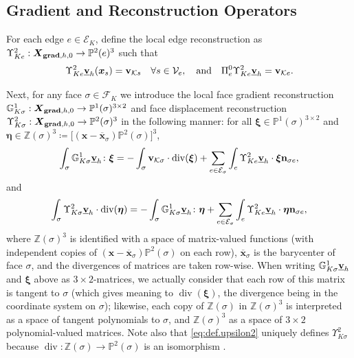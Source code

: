 \documentclass[a4paper,11pt]{article}
\theoremstyle{definition}
\theoremstyle{remark}
\newcommand{\bvec}[1]{\boldsymbol{#1}}
\newcommand{\bo}[1]{\mathbf{#1}}
\newcommand{\bx}{\bvec{x}}
\newcommand{\bos}[1]{\boldsymbol{#1}}
\def\G{\mathbb{G}}
\def\cE{\mathcal{E}}
\def\cF{\mathcal{F}}
\def\cK{\mathcal{K}}
\def\cV{\mathcal{V}}
\def\Up{\Upsilon}
\def\bv{{\bf{v}}}
\def\ddgs{\boldsymbol{X}_{{\bf grad},h,0}}
\newcommand{\Ks}{{\mathcal{K}s}}
\newcommand{\Ke}{{\mathcal{K}e}}
\newcommand{\DIV}{\operatorname{\mathrm{div}}}
\begin{document}

\subsection{Gradient and Reconstruction Operators}\label{subsec reconstruct}

For each edge $e\in\cE_K$, define the local edge reconstruction as $\Upsilon_{Ke}^2:\ddgs\rightarrow \mathbb P^2(e)^3$ such that
$$
\Upsilon_{Ke}^2\underline{\bv}_h(\bx_s)=\bo{v}_{\Ks}\quad \forall s\in\cV_e,\quad\text{and}\quad
\Pi^0_e\Upsilon^2_{Ke}\underline{\bv}_h=\bo{v}_{\Ke}.
$$

Next, for any face $\sigma\in\cF_K$ we introduce the local face gradient reconstruction $\mathbb G^1_{K\sigma}:\ddgs\rightarrow \mathbb P^1(\sigma)^{3\times 2}$ and face displacement reconstruction $\Upsilon^2_{K\sigma}:\ddgs\rightarrow \mathbb P^2(\sigma)^3$ in the following manner: for all $\bos{\xi}\in\mathbb P^1(\sigma)^{3\times 2}$ and $\bos{\eta}\in\mathbb Z(\sigma)^3\coloneqq\big[(\bx-\overline{\bx}_\sigma)\mathbb P^2(\sigma)\big]^3$,
\begin{equation*}%
\int_\sigma \G^1_{K\sigma}\underline{\bv}_h\colon\bos{\xi}=-\int_\sigma \bo{v}_{\cK\sigma}\cdot\DIV(\bos{\xi})+\sum_{e\in\cE_\sigma}\int_e \Up^2_{Ke}\underline{\bv}_h\cdot\bo{\bos{\xi}}{{\bf n}_{\sigma e}},
\end{equation*}
and
\begin{equation}\label{eq:def.upsilon2}
\int_\sigma \Up^2_{K\sigma}\underline{\bv}_h\cdot\DIV(\bos{\eta})=-\int_\sigma \G^1_{K\sigma}\underline{\bv}_h\colon\bos{\eta}+\sum_{e\in\cE_\sigma}\int_e \Up^2_{Ke}\underline{\bv}_h\cdot\bos{\eta}{\bo{\bf n}_{\sigma e}},
\end{equation}
where $\mathbb Z(\sigma)^3$ is identified with a space of matrix-valued functions (with independent copies of $(\bx-\overline{\bx}_\sigma)\mathbb P^2(\sigma)$ on each row), $\overline{\bx}_\sigma$ is the barycenter of face $\sigma$, and the divergences of matrices are taken row-wise.
When writing $\G^1_{K\sigma}\underline{\bv}_h$ and $\bos{\xi}$ above as $3\times 2$-matrices, we actually consider that each row of this matrix is tangent to $\sigma$ (which gives meaning to $\DIV(\bos{\xi})$, the divergence being in the coordinate system on $\sigma$); likewise, each copy of $\mathbb Z(\sigma)$ in $\mathbb Z(\sigma)^3$ is interpreted as a space of tangent polynomials to $\sigma$, and $\mathbb Z(\sigma)^3$ as a space of $3\times 2$ polynomial-valued matrices. Note also that \eqref{eq:def.upsilon2} uniquely defines $\Up^2_{K\sigma}$ because $\DIV:\mathbb Z(\sigma)\to \mathbb{P}^2(\sigma)$ is an isomorphism \cite[Corollary 7.3]{Arnold:18}.
\end{document}
